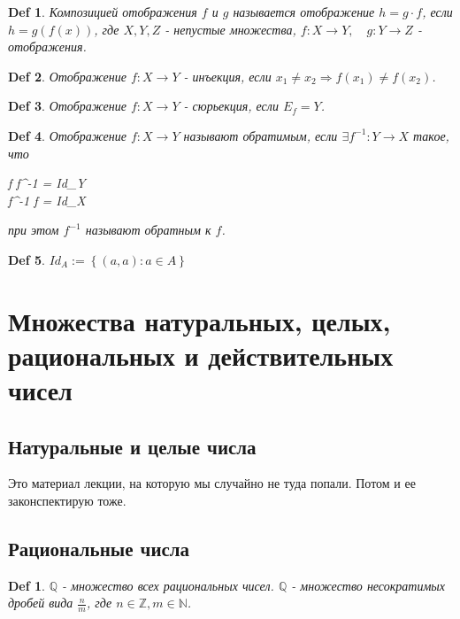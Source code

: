 \documentclass[a5paper, 10pt]{article}
\theoremstyle{plain}
\newtheorem{definition}{Def}
\newtheorem*{definition_}{Def}
\newcommand{\N}{\mathbb N}
\newcommand{\Z}{\mathbb Z}
\newcommand{\Q}{\mathbb Q}
\newcommand{\rarrow}{\Rightarrow}
\begin{document}
	\begin{definition}
	Композицией отображения $ f $ и $ g $ называется отображение $ h = g \cdot f $,
	если $ h = g(f(x)) $, где $ X, Y, Z $ - непустые множества,
	$ f: X \rightarrow Y, \quad g: Y \rightarrow Z $ - отображения.
	\end{definition}

	\begin{definition}
	Отображение $ f : X \rightarrow Y $ - инъекция, если
	$ x_1 \neq x_2 \rarrow f(x_1) \neq f(x_2) $.
	\end{definition}

	\begin{definition}
	Отображение $ f : X \rightarrow Y $ - сюрьекция, если $ E_f = Y $.
	\end{definition}

	\begin{definition}
		Отображение $ f : X \rightarrow Y $ называют обратимым,
		если $ \exists f^{-1}: Y \rightarrow X $ такое, что

		\begin{cases}
			f \cdot f^{-1} = Id_Y \\
			f^{-1} \cdot f = Id_X \\
		\end{cases}

		при этом $ f^{-1} $ называют обратным к $ f $.
	\end{definition}

	\begin{definition}
	$ Id_A := \left\{ (a, a): a \in A \right\} $
	\end{definition}

	\section{Множества натуральных, целых, рациональных и действительных чисел}

	\subsection{Натуральные и целые числа}

	Это материал лекции, на которую мы случайно не туда попали. Потом и ее законспектирую тоже.

	\subsection{Рациональные числа}

	\begin{definition_}
	$ \Q $ - множество всех рациональных чисел. \newline
	$ \Q $ - множество несократимых дробей вида $ \frac{n}{m} $, где $ n \in \Z, m \in \N $.
	\end{definition_}
\end{document}
